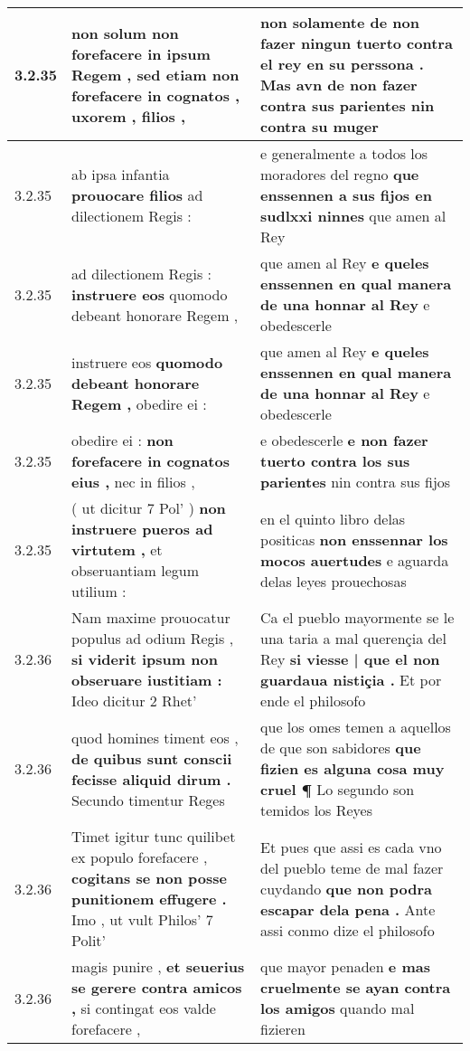 \begin{tabular}{|p{1cm}|p{6.5cm}|p{6.5cm}|}
3.2.35 & non solum non forefacere in ipsum Regem , \textbf{ sed etiam non forefacere in cognatos , } uxorem , filios , & non solamente de non fazer ningun tuerto contra el rey en su perssona . \textbf{ Mas avn de non fazer contra sus parientes } nin contra su muger \\\hline
3.2.35 & ab ipsa infantia \textbf{ prouocare filios } ad dilectionem Regis : & e generalmente a todos los moradores del regno \textbf{ que enssennen a sus fijos en sudlxxi ninnes } que amen al Rey \\\hline
3.2.35 & ad dilectionem Regis : \textbf{ instruere eos } quomodo debeant honorare Regem , & que amen al Rey \textbf{ e queles enssennen en qual manera de una honnar al Rey } e obedescerle \\\hline
3.2.35 & instruere eos \textbf{ quomodo debeant honorare Regem , } obedire ei : & que amen al Rey \textbf{ e queles enssennen en qual manera de una honnar al Rey } e obedescerle \\\hline
3.2.35 & obedire ei : \textbf{ non forefacere in cognatos eius , } nec in filios , & e obedescerle \textbf{ e non fazer tuerto contra los sus parientes } nin contra sus fijos \\\hline
3.2.35 & ( ut dicitur 7 Pol’ ) \textbf{ non instruere pueros ad virtutem , } et obseruantiam legum utilium : & en el quinto libro delas positicas \textbf{ non enssennar los mocos auertudes } e aguarda delas leyes prouechosas \\\hline
3.2.36 & Nam maxime prouocatur populus ad odium Regis , \textbf{ si viderit ipsum non obseruare iustitiam : } Ideo dicitur 2 Rhet’ & Ca el pueblo mayormente se le una taria a mal querençia del Rey \textbf{ si viesse | que el non guardaua nistiçia . } Et por ende el philosofo \\\hline
3.2.36 & quod homines timent eos , \textbf{ de quibus sunt conscii fecisse aliquid dirum . } Secundo timentur Reges & que los omes temen a aquellos de que son sabidores \textbf{ que fizien es alguna cosa muy cruel ¶ } Lo segundo son temidos los Reyes \\\hline
3.2.36 & Timet igitur tunc quilibet ex populo forefacere , \textbf{ cogitans se non posse punitionem effugere . } Imo , ut vult Philos’ 7 Polit’ & Et pues que assi es cada vno del pueblo teme de mal fazer cuydando \textbf{ que non podra escapar dela pena . } Ante assi conmo dize el philosofo \\\hline
3.2.36 & magis punire , \textbf{ et seuerius se gerere contra amicos , } si contingat eos valde forefacere , & que mayor penaden \textbf{ e mas cruelmente se ayan contra los amigos } quando mal fizieren \\\hline

\end{tabular}
